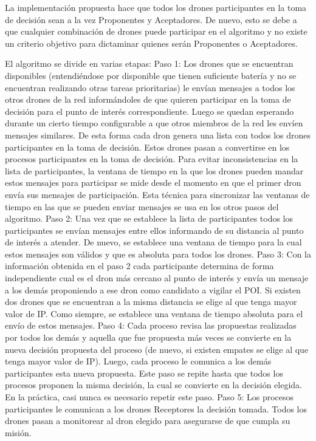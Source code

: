 La implementación propuesta hace que todos los drones participantes en la toma de decisión sean a la vez Proponentes y Aceptadores. De nuevo, esto se debe a que cualquier combinación de drones puede participar en el algoritmo y no existe un criterio objetivo para dictaminar quienes serán Proponentes o Aceptadores.

El algoritmo se divide en varias etapas:
Paso 1: Los drones que se encuentran disponibles (entendiéndose por disponible que tienen suficiente batería y no se encuentran realizando otras tareas prioritarias) le envían mensajes a todos los otros drones de la red informándoles de que quieren participar en la toma de decisión para el punto de interés correspondiente. Luego se quedan esperando durante un cierto tiempo configurable a que otros miembros de la red les envíen mensajes similares. De esta forma cada dron genera una lista con todos los drones participantes en la toma de decisión. Estos drones pasan a convertirse en los procesos participantes en la toma de decisión. Para evitar inconsistencias en la lista de participantes, la ventana de tiempo en la que los drones pueden mandar estos mensajes para participar se mide desde el momento en que el primer dron envía sus mensajes de participación. Esta técnica para sincronizar las ventanas de tiempo en las que se pueden enviar mensajes se usa en los otros pasos del algoritmo.
Paso 2: Una vez que se establece la lista de participantes todos los participantes se envían mensajes entre ellos informando de su distancia al punto de interés a atender. De nuevo, se establece una ventana de tiempo para la cual estos mensajes son válidos y que es absoluta para todos los drones.
Paso 3: Con la información obtenida en el paso 2 cada participante determina de forma independiente cual es el dron más cercano al punto de interés y envía un mensaje a los demás proponiendo a ese dron como candidato a vigilar el POI. Si existen dos drones que se encuentran a la misma distancia se elige al que tenga mayor valor de IP. Como siempre, se establece una ventana de tiempo absoluta para el envío de estos mensajes.
Paso 4: Cada proceso revisa las propuestas realizadas por todos los demás y aquella que fue propuesta más veces se convierte en la nueva decisión propuesta del proceso (de nuevo, si existen empates se elige al que tenga mayor valor de IP). Luego, cada proceso le comunica a los demás participantes esta nueva propuesta. Este paso se repite hasta que todos los procesos proponen la misma decisión, la cual se convierte en la decisión elegida. En la práctica, casi nunca es necesario repetir este paso.
Paso 5: Los procesos participantes le comunican a los drones Receptores la decisión tomada. Todos los drones pasan a monitorear al dron elegido para asegurarse de que cumpla su misión.

